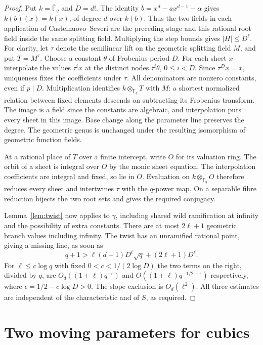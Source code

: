\documentclass[preprint,12pt,numbers]{elsarticle}
\begin{document}
\begin{proof}
Put $k=\overline{\mathbb F}_q$ and $D=d!$. The identity
$b=x^d-ax^{d-1}-\alpha$ gives $k(b)(x)=k(x)$, of degree $d$ over
$k(b)$. Thus the two fields in each application of Castelnuovo--Severi
are the preceding stage and this rational root field inside the same
splitting field. Multiplying the step bounds gives $|H|\le D^\ell$.
For clarity, let $\tau$ denote the semilinear lift on the geometric
splitting field $M$, and put $T=M^\tau$. Choose a constant $\theta$
of Frobenius period $D$. For each sheet $x$ interpolate the values
$\tau^i x$ at the distinct nodes $\tau^i\theta$, $0\le i<D$.
Since $\tau^D x=x$, uniqueness fixes the coefficients under $\tau$.
All denominators are nonzero constants, even if $p\mid D$.
Multiplication identifies $k\otimes_{\mathbb F_q}T$ with $M$:
a shortest normalized relation between fixed elements descends on
subtracting its Frobenius transform. The image is a field since
the constants are algebraic, and interpolation puts every sheet
in this image. Base change along the parameter line preserves the
degree. The geometric genus is unchanged under the resulting
isomorphism of geometric function fields.

At a rational place of $T$ over a finite intercept, write $O$ for
its valuation ring. The orbit of a sheet is integral over $O$ by the
monic sheet equation. The interpolation coefficients are integral
and fixed, so lie in $O$. Evaluation on $k\otimes_{\mathbb F_q}O$
therefore reduces every sheet and intertwines $\tau$ with the
$q$-power map. On a separable fibre reduction bijects the two root
sets and gives the required conjugacy.

Lemma~\ref{lem:twist} now applies to $\gamma$, including shared wild ramification at infinity
and the possibility of extra constants. There are at most $2\ell+1$
geometric branch values including infinity. The twist has an
unramified rational point, giving a missing line, as soon as
\[
 q+1>\ell(d-1)D^\ell\sqrt q+(2\ell+1)D^\ell.
\]
For $\ell\le c\log q$ with fixed $0<c<1/(2\log D)$ the two terms
on the right, divided by $q$, are
$O_d((1+\ell)q^{-\epsilon})$ and
$O((1+\ell)q^{-1/2-\epsilon})$ respectively, where
$\epsilon=1/2-c\log D>0$. The slope exclusion is $O_d(\ell^2)$.
All three estimates are independent of the characteristic and of
$S$, as required.
\end{proof}

\section{Two moving parameters for cubics}\label{sec:cubic-surface}
\end{document}
